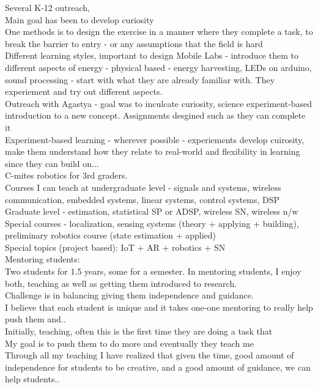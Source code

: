 \documentclass[10pt]{article}
\begin{document}
Several K-12 outreach,\\
Main goal has been to develop curiosity \\
One methods is to design the exercise in a manner where they complete a task, to break the barrier to entry - or any assumptions that the field is hard\\ Different learning styles, important to design 
Mobile Labs - introduce them to different aspects of energy - physical based - energy harvesting, LEDs on arduino, sound processing - start with what they are already familiar with. They experiement and try out different aspects. \\
Outreach with Agastya - goal was to inculcate curiosity, science experiment-based introduction to a new concept. Assignments desgined such as they can complete it\\
Experiment-based learning - wherever possible - experiements develop cuirosity, make them understand how they relate to real-world and flexibility in learning since they can build on...\\
C-mites robotics for 3rd graders.\\

Courses I can teach at undergraduate level - signals and systems, wireless communication, embedded systems, linear systems, control systems,  DSP\\
Graduate level - estimation, statistical SP or ADSP, wireless SN, wireless n/w\\
Special courses - localization, sensing systems (theory + applying + building), preliminary robotics course (state estimation + applied)\\
Special topics (project based): IoT + AR + robotics + SN\\

Mentoring students:\\
Two students for 1.5 years, some for a semester. In mentoring students, I enjoy both, teaching as well as getting them introduced to research. \\Challenge is in balancing giving them independence and guidance. \\
I believe that each student is unique and it takes one-one mentoring to really help push them and..\\
Initially, teaching, often this is the first time they are doing a task that \\
My goal is to push them to do more and eventually they teach me\\

Through all my teaching I have realized that given the time, good amount of independence for students to be creative, and a good amount of guidance, we can help students..\\





\small


\end{document}
